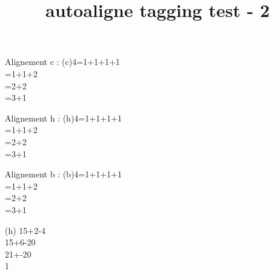 \documentclass{article}
\title{autoaligne tagging test - 2}
\begin{document}
Alignement c :
\autoaligne(c){4=1+1+1+1\\=1+1+2\\=2+2\\=3+1}
\medbreak

Alignement h :
\autoaligne(h){4=1+1+1+1\\=1+1+2\\=2+2\\=3+1}
\medbreak

Alignement b :
\autoaligne(b){4=1+1+1+1\\=1+1+2\\=2+2\\=3+1}

\autoaligne[*c](h){
15+2-4\\
15+6-20\\
21+-20\\
1}
\end{document}
